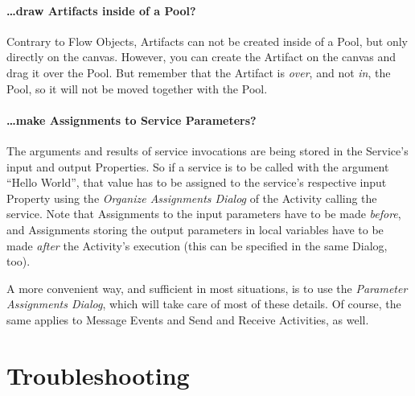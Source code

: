 \paragraph*{\dots draw Artifacts inside of a Pool?}
Contrary to Flow Objects, Artifacts can not be created inside of a Pool, but only
directly on the canvas.  However, you can create the Artifact on the canvas and
drag it over the Pool.  But remember that the Artifact is \emph{over}, and not
\emph{in}, the Pool, so it will not be moved together with the Pool.


\paragraph*{\dots make Assignments to Service Parameters?}
The arguments and results of service invocations are being stored in the Service's
input and output Properties.  So if a service is to be called with the argument
``Hello World'', that value has to be assigned to the service's respective input
Property using the \emph{Organize Assignments Dialog} of the Activity calling the
service.  Note that Assignments to the input parameters have to be made
\emph{before}, and Assignments storing the output parameters in local variables
have to be made \emph{after} the Activity's execution (this can be specified in the same Dialog, too).


A more convenient way, and sufficient in most situations, is to use the
\emph{Parameter Assignments Dialog}, which will take care of most of these details.
Of course, the same applies to Message Events and Send and Receive Activities, as
well.




\section{Troubleshooting}


